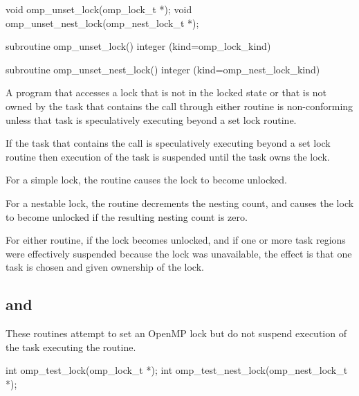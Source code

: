 \format
\ccppspecificstart
\begin{boxedcode}
void omp\_unset\_lock(omp\_lock\_t *);
void omp\_unset\_nest\_lock(omp\_nest\_lock\_t *);
\end{boxedcode}
\ccppspecificend

\fortranspecificstart
\begin{boxedcode}
subroutine omp\_unset\_lock()
integer (kind=omp\_lock\_kind) 

subroutine omp\_unset\_nest\_lock()
integer (kind=omp\_nest\_lock\_kind) 
\end{boxedcode}
\fortranspecificend

\constraints
A program that accesses a lock that is not in the locked state or that is 
not owned by the task that contains the call through either routine is 
non-conforming unless that task is speculatively executing beyond a set 
lock routine.

\effect
If the task that contains the call is speculatively executing beyond a
set lock routine then execution of the task is suspended until the task 
owns the lock.

For a simple lock, the  routine causes the lock to become unlocked.

For a nestable lock, the  routine decrements the nesting 
count, and causes the lock to become unlocked if the resulting nesting count is zero.

For either routine, if the lock becomes unlocked, and if one or more task 
regions were effectively suspended because the lock was unavailable, the 
effect is that one task is chosen and given ownership of the lock. 









\subsection{ and }
\label{subsec:omp_test_lock and omp_test_nest_lock}
\summary
These routines attempt to set an OpenMP lock but do not suspend execution of the task 
executing the routine.

\format
\ccppspecificstart
\begin{boxedcode}
int omp\_test\_lock(omp\_lock\_t *);
int omp\_test\_nest\_lock(omp\_nest\_lock\_t *);
\end{boxedcode}
\ccppspecificend

